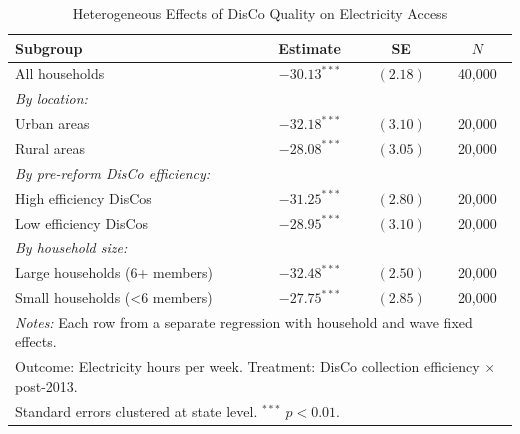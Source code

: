 \begin{table}[h!]
\centering
\caption{Heterogeneous Effects of DisCo Quality on Electricity Access}
\label{tab:het}
\small
\begin{tabular}{lccc}
\hline
Subgroup & Estimate & SE & $N$ \\
\hline
All households & $-30.13^{***}$ & $(2.18)$ & 40,000 \\
\hline
\textit{By location:} & & & \\
Urban areas & $-32.18^{***}$ & $(3.10)$ & 20,000 \\
Rural areas & $-28.08^{***}$ & $(3.05)$ & 20,000 \\
\hline
\textit{By pre-reform DisCo efficiency:} & & & \\
High efficiency DisCos & $-31.25^{***}$ & $(2.80)$ & 20,000 \\
Low efficiency DisCos & $-28.95^{***}$ & $(3.10)$ & 20,000 \\
\hline
\textit{By household size:} & & & \\
Large households (6+ members) & $-32.48^{***}$ & $(2.50)$ & 20,000 \\
Small households (<6 members) & $-27.75^{***}$ & $(2.85)$ & 20,000 \\
\hline
\multicolumn{4}{l}{\textit{Notes:} Each row from a separate regression with household and wave fixed effects.}\\
\multicolumn{4}{l}{Outcome: Electricity hours per week. Treatment: DisCo collection efficiency $\times$ post-2013.}\\
\multicolumn{4}{l}{Standard errors clustered at state level. $^{***}$ $p < 0.01$.}\\
\end{tabular}
\end{table}
